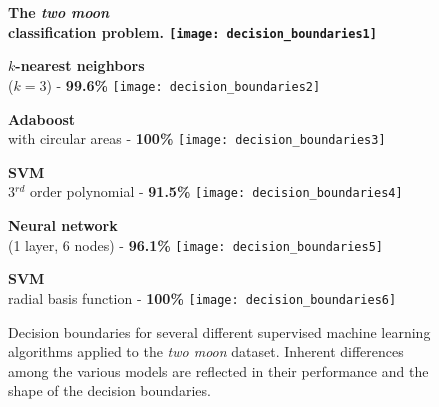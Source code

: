 \begin{figure}
	\begin{minipage}{0.33\textwidth}
		\centering
		\footnotesize \bf The \emph{two moon}\\classification problem.
		\texttt{[image: decision\_boundaries1]}
	\end{minipage}
	\begin{minipage}{0.33\textwidth}
		\centering
		\footnotesize {\bf $k$-nearest neighbors}\\($k=3$) - {\bf 99.6\%}
		\texttt{[image: decision\_boundaries2]}
	\end{minipage}
	\begin{minipage}{0.33\textwidth}
		\centering
		\footnotesize {\bf Adaboost}\\with circular areas - {\bf 100\%}
		\texttt{[image: decision\_boundaries3]}
	\end{minipage}
	\begin{minipage}{0.33\textwidth}
		\centering
		\vskip0.5cm
		\footnotesize {\bf SVM}\\3$^{rd}$ order polynomial - {\bf 91.5\%}
		\texttt{[image: decision\_boundaries4]}
	\end{minipage}
	\begin{minipage}{0.33\textwidth}
		\centering
		\vskip0.5cm
		\footnotesize {\bf Neural network}\\(1 layer, 6 nodes) - {\bf 96.1\%}
		\texttt{[image: decision\_boundaries5]}
	\end{minipage}
	\begin{minipage}{0.33\textwidth}
		\centering
		\vskip0.5cm
		\footnotesize {\bf SVM}\\radial basis function - {\bf 100\%}
		\texttt{[image: decision\_boundaries6]}
	\end{minipage}
	\caption[Decision boundaries for several different SML algorithms]{Decision boundaries for 	several different supervised machine learning algorithms applied to the \emph{two moon} dataset. Inherent differences among the various models are reflected in their performance and the shape of the decision boundaries.}
	\label{fig:decision_boundaries}
\end{figure}


